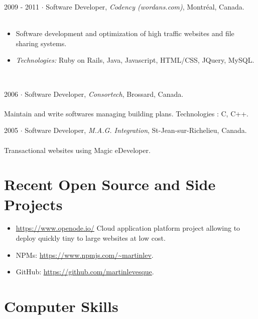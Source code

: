 \documentclass{cv}
\begin{document}
\begin{formation}
   \item[2009 - 2011]
     $\cdot$ Software Developer, \textit{Codency (wordans.com)}, Montr\'eal, Canada. \\ ~\\

\begin{itemize}
\item Software development and optimization of high traffic websites and file sharing systems.
\item \textit{Technologies:} Ruby on Rails, Java, Javascript, HTML/CSS, JQuery, MySQL.
\end{itemize}     
       \normalsize
~\newpage
   \item[2006]
     $\cdot$ Software Developer, \textit{Consortech}, Brossard, Canada. \\ ~\\
     \small Maintain and write softwares managing building plans. Technologies : C, C++. \normalsize
     
   \item[2005]
     $\cdot$ Software Developer, \textit{M.A.G. Integration}, St-Jean-sur-Richelieu, Canada. \\ ~\\
     \small Transactional websites using Magic eDeveloper. \normalsize
\end{formation}



\section{Recent Open Source and Side Projects}

\begin{itemize}
\item \url{https://www.openode.io/} Cloud application platform project allowing to deploy quickly tiny to large websites at low cost. 
\item NPMs: \url{https://www.npmjs.com/~martinlev}.
\item GitHub: \url{https://github.com/martinlevesque}.
\end{itemize}

\section{Computer Skills}
\end{document}
